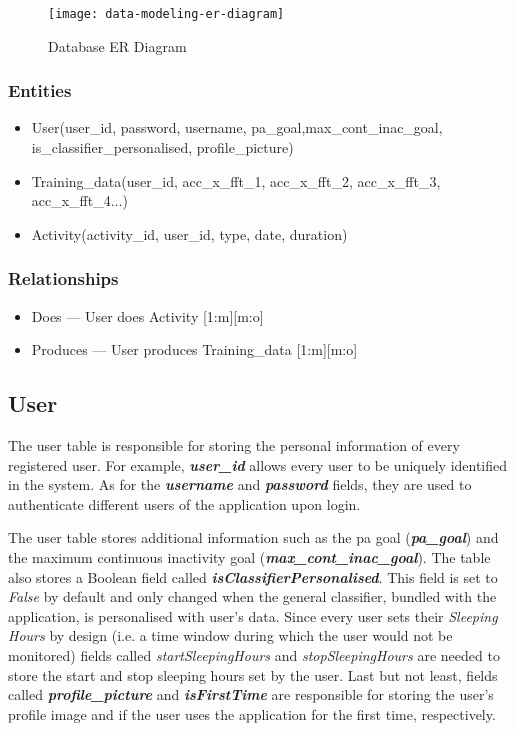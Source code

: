        \begin{figure}[ht]
            \centering
            \texttt{[image: data-modeling-er-diagram]}
            \caption{Database ER Diagram}
            \label{fig:data_modeling_er_diagram}
        \end{figure}
        
        \subsubsection{Entities}
        
        \begin{itemize}
            \item User(user\_id, password, username, pa\_goal,max\_cont\_inac\_goal, is\_classifier\_personalised, profile\_picture)
            \item Training\_data(user\_id, acc\_x\_fft\_1, acc\_x\_fft\_2, acc\_x\_fft\_3, acc\_x\_fft\_4...)
            \item Activity(activity\_id, user\_id, type, date, duration)
        \end{itemize}
        
        \subsubsection{Relationships}
        \begin{itemize}
        \item Does --- User does Activity [1:m][m:o]
        \item Produces --- User produces Training\_data [1:m][m:o]
        \end{itemize}
        
        \subsection{User}
        The user table is responsible for storing the personal information of every registered user. For example, \textbf{\textit{user\_id}} allows every user to be uniquely identified in the system. As for the \textbf{\textit{username}} and \textbf{\textit{password}} fields, they are used to authenticate different users of the application upon login.
        
        The user table stores additional information such as the \gls{pa} goal (\textbf{\textit{pa\_goal}}) and the maximum continuous inactivity goal (\textbf{\textit{max\_cont\_inac\_goal}}). The table also stores a Boolean field called \textbf{\textit{isClassifierPersonalised}}. This field is set to \textit{False} by default and only changed when the general classifier, bundled with the application, is personalised with user's data. Since every user sets their \textit{Sleeping Hours} by design (i.e. a time window during which the user would not be monitored) fields called \textit{startSleepingHours} and \textit{stopSleepingHours} are needed to store the start and stop sleeping hours set by the user. Last but not least, fields called \textbf{\textit{profile\_picture}} and \textbf{\textit{isFirstTime}} are responsible for storing the user's profile image and if the user uses the application for the first time, respectively.
        
